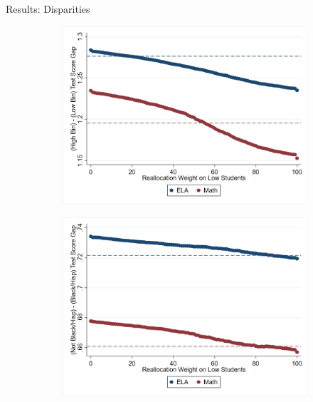 \documentclass[t,aspectratio=169]{beamer}
\begin{document}
\begin{frame}{Results: Disparities}

    \begin{figure}[H]
        \centering
          \centering
         \begin{subfigure}[b]{0.45\textwidth}
            \includegraphics[width=1\textwidth]{Working_Paper/WP_Figures/test_score_gaps.png}
        \end{subfigure}
        \begin{subfigure}[b]{0.45\textwidth}
            \includegraphics[width=1\textwidth]{Working_Paper/WP_Figures/race_gaps.png}
        \end{subfigure}
    \end{figure}
    
\end{frame}
\end{document}
